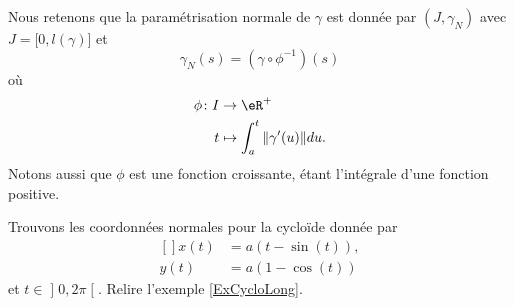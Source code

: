 Nous retenons que la paramétrisation normale de $\gamma$ est donnée par $(J,\gamma_N)$ avec $J=\mathopen[ 0 , l(\gamma) \mathclose]$ et 
\begin{equation}        \label{EqFomVPcogammaN}
    \gamma_N(s)=(\gamma\circ\phi^{-1})(s)
\end{equation}
où
\begin{equation}        \label{EqFomVPcoordnorm}
    \begin{aligned}
        \phi\colon I&\to \eR^+ \\
        t&\mapsto \int_a^t\| \gamma'(u) \|du. 
    \end{aligned}
\end{equation}
Notons aussi que $\phi$ est une fonction croissante, étant l'intégrale d'une fonction positive.

\begin{example}
    Trouvons les coordonnées normales pour la cycloïde donnée par
    \begin{equation}
        \begin{aligned}[]
            x(t)&=a(t-\sin(t)),\\
            y(t)&=a(1-\cos(t))
        \end{aligned}
    \end{equation}
    et $t\in\mathopen] 0 , 2\pi \mathclose[$. Relire l'exemple \ref{ExCycloLong}.
    

\end{example}

